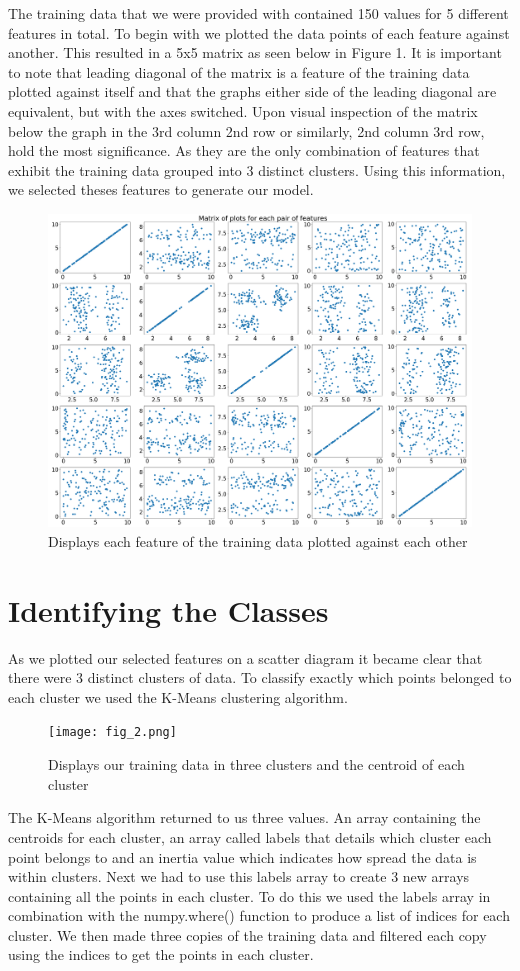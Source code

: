 \documentclass[A4Page,11pt]{article}
\begin{document}
The training data that we were provided with contained 150 values for 5 different features in total. To begin with we plotted the data points of each feature against another. This resulted in a 5x5 matrix as seen below in Figure 1. It is important to note that leading diagonal of the matrix is a feature of the training data plotted against itself and that the graphs either side of the leading diagonal are equivalent, but with the axes switched. Upon visual inspection of the matrix below the graph in the 3rd column 2nd row or similarly, 2nd column 3rd row, hold the most significance. As they are the only combination of features that exhibit the training data grouped into 3 distinct clusters. Using this information, we selected theses features to generate our model.
\begin{figure}[h!]
\centering
\includegraphics[width=0.65\linewidth]{download.png}
\caption{\label{fig 1:}Displays each feature of the training data plotted against each other}
\end{figure}



\section{Identifying the Classes}
As we plotted our selected features on a scatter diagram it became clear that there were 3 distinct clusters of data. To classify exactly which points belonged to each cluster we used the K-Means clustering algorithm. 
\begin{figure}[h!]
\centering
\texttt{[image: fig\_2.png]}
\caption{\label{fig 2:}Displays our training data in three clusters and the centroid of each cluster}
\end{figure}

The K-Means algorithm returned to us three values. An array containing the centroids for each cluster, an array called labels that details which cluster each point belongs to and an inertia value which indicates how spread the data is within clusters. Next we had to use this labels array to create 3 new arrays containing all the points in each cluster. To do this we used the labels array in combination with the numpy.where() function to produce a list of indices for each cluster. We then made three copies of the training data and filtered each copy using the indices to get the points in each cluster.
\end{document}
